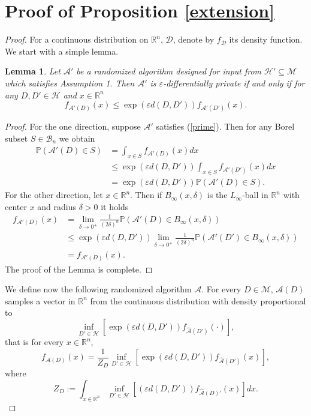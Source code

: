\documentclass[12pt,a4paper]{article}
\numberwithin{equation}{section}
\newtheorem{lemma}[theorem]{Lemma}
\numberwithin{equation}{section}
\renewcommand{\epsilon}{\varepsilon}
\newcommand{\1}{{\text{\Large $\mathfrak 1$}}}
\newcommand{\2}[1]{{\text{\Large $\mathfrak 1$}\!\left(#1\right)}}
\begin{document}
\section{Proof of Proposition \ref{extension}}
\begin{proof} For a continuous distribution on $\mathbb{R}^n$, $\mathcal{D}$, denote by $f_{\mathcal{D}}$ its density function. We start with a simple lemma.
\begin{lemma}\label{lem}
Let $\mathcal{A}'$ be a randomized algorithm designed for input from $\mathcal{H}' \subseteq \mathcal{M}$ which satisfies Assumption 1. Then $\mathcal{A}'$ is $\epsilon$-differentially private if and only if  for any $D,D' \in \mathcal{H}$ and $x \in \mathbb{R}^n$ \begin{equation}\label{prime}  f_{\mathcal{A}'(D)}(x) \leq \exp \left(\epsilon d(D,D') \right) f_{\mathcal{A}'(D')}(x).   \end{equation} 
\end{lemma}
\begin{proof}
For the one direction, suppose $\mathcal{A}'$ satisfies (\ref{prime}). Then for any Borel subset $S \in \mathcal{B}_n$ we obtain
 \begin{align*} \mathbb{P}\left(\mathcal{A}'(D) \in S \right) &=\int_{x \in S}  f_{\mathcal{A}'(D)}(x)dx \\
& \leq \exp \left(\epsilon d(D,D') \right) \int_{x \in S} f_{\mathcal{A}'(D')}(x) dx\\
&= \exp \left(\epsilon d(D,D') \right)\mathbb{P}\left(\mathcal{A}'(D) \in S \right).
 \end{align*}For the other direction, let $x \in \mathbb{R}^n$. Then if $B_{\infty}(x,\delta)$ is the $L_{\infty}$-ball in $\mathbb{R}^n$ with center $x$ and radius $\delta>0$ it holds
\begin{align*} 
f_{\mathcal{A'}(D)}(x)&=\lim_{\delta \rightarrow 0^{+}} \frac{1}{(2\delta)^n} \mathbb{P}\left(\mathcal{A}'(D) \in B_{\infty}(x,\delta) \right)\\
& \leq  \exp \left(\epsilon d(D,D') \right) \lim_{\delta \rightarrow 0^{+}} \frac{1}{(2\delta)^n} \mathbb{P}\left(\mathcal{A}'(D') \in B_{\infty}(x,\delta) \right)\\
&=f_{\mathcal{A'}(D)}(x).
\end{align*}The proof of the Lemma is complete.
\end{proof} We define now the following randomized algorithm $\mathcal{A}$. For every $D \in \mathcal{M}$, $\mathcal{A}(D)$ samples a vector in $\mathbb{R}^n$ from the continuous distribution with density proportional to $$\inf_{D' \in \mathcal{H}} \left[ \exp\left(\epsilon d(D,D')\right) f_{\hat{\mathcal{A}}(D')}(\cdot) \right],$$ that is for every $x \in \mathbb{R}^n$, \begin{equation*}f_{\mathcal{A}(D)}(x) =\frac{1}{Z_D} \inf_{D' \in \mathcal{H}} \left[ \exp\left(\epsilon d(D,D')\right) f_{\hat{\mathcal{A}}(D')}(x) \right],\end{equation*} where \begin{equation*}Z_D:=\int_{x \in \mathbb{R}^n} \inf_{D' \in \mathcal{H}} \left[ \left(\epsilon d(D,D')\right) f_{\hat{\mathcal{A}}(D)'}(x) \right] dx.\end{equation*}


\end{proof}
\end{document}
